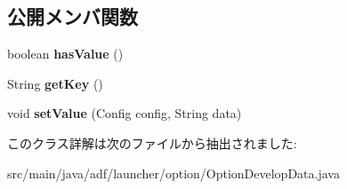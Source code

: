 \subsection*{公開メンバ関数}
\begin{DoxyCompactItemize}
\item 
\hypertarget{classadf_1_1launcher_1_1option_1_1OptionDevelopData_a614e15aa7842feb932559bf6955cdc95}{}\label{classadf_1_1launcher_1_1option_1_1OptionDevelopData_a614e15aa7842feb932559bf6955cdc95} 
boolean {\bfseries has\+Value} ()
\item 
\hypertarget{classadf_1_1launcher_1_1option_1_1OptionDevelopData_a14926105e891779eea36b54e0f01881a}{}\label{classadf_1_1launcher_1_1option_1_1OptionDevelopData_a14926105e891779eea36b54e0f01881a} 
String {\bfseries get\+Key} ()
\item 
\hypertarget{classadf_1_1launcher_1_1option_1_1OptionDevelopData_abbf9f16c961a032534479722f65ab584}{}\label{classadf_1_1launcher_1_1option_1_1OptionDevelopData_abbf9f16c961a032534479722f65ab584} 
void {\bfseries set\+Value} (Config config, String data)
\end{DoxyCompactItemize}


このクラス詳解は次のファイルから抽出されました\+:\begin{DoxyCompactItemize}
\item 
src/main/java/adf/launcher/option/Option\+Develop\+Data.\+java\end{DoxyCompactItemize}
